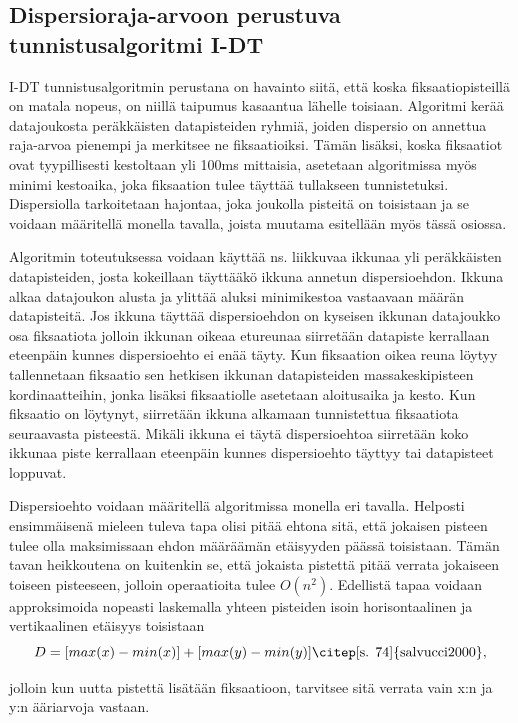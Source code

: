 \subsection{Dispersioraja-arvoon perustuva tunnistusalgoritmi I-DT}
I-DT tunnistusalgoritmin perustana on havainto siitä, että koska fiksaatiopisteillä on matala nopeus, on niillä taipumus kasaantua lähelle toisiaan. Algoritmi kerää datajoukosta peräkkäisten datapisteiden ryhmiä, joiden dispersio on annettua raja-arvoa pienempi ja merkitsee ne fiksaatioiksi. Tämän lisäksi, koska fiksaatiot ovat tyypillisesti kestoltaan yli 100ms mittaisia, asetetaan algoritmissa myös minimi kestoaika, joka fiksaation tulee täyttää tullakseen tunnistetuksi. \citep[s. 74]{salvucci2000} Dispersiolla tarkoitetaan hajontaa, joka joukolla pisteitä on toisistaan ja se voidaan määritellä monella tavalla, joista muutama esitellään myös tässä osiossa.

Algoritmin toteutuksessa voidaan käyttää ns. liikkuvaa ikkunaa yli peräkkäisten datapisteiden, josta kokeillaan täyttääkö ikkuna annetun dispersioehdon. Ikkuna alkaa datajoukon alusta ja ylittää aluksi minimikestoa vastaavaan määrän datapisteitä. Jos ikkuna täyttää dispersioehdon on kyseisen ikkunan datajoukko osa fiksaatiota jolloin ikkunan oikeaa etureunaa siirretään datapiste kerrallaan eteenpäin kunnes dispersioehto ei enää täyty. Kun fiksaation oikea reuna löytyy tallennetaan fiksaatio sen hetkisen ikkunan datapisteiden massakeskipisteen kordinaatteihin, jonka lisäksi fiksaatiolle asetetaan aloitusaika ja kesto. Kun fiksaatio on löytynyt, siirretään ikkuna alkamaan tunnistettua fiksaatiota seuraavasta pisteestä. Mikäli ikkuna ei täytä dispersioehtoa siirretään koko ikkunaa piste kerrallaan eteenpäin kunnes dispersioehto täyttyy tai datapisteet loppuvat. \citep[s.26-27]{gale1984}

Dispersioehto voidaan määritellä algoritmissa monella eri tavalla. Helposti ensimmäisenä mieleen tuleva tapa olisi pitää ehtona sitä, että jokaisen pisteen tulee olla maksimissaan ehdon määräämän etäisyyden päässä toisistaan. Tämän tavan heikkoutena on kuitenkin se, että jokaista pistettä pitää verrata jokaiseen toiseen pisteeseen, jolloin operaatioita tulee \(O(n^2)\). \citep[s.111] {shic2008} Edellistä tapaa voidaan approksimoida nopeasti laskemalla yhteen pisteiden isoin horisontaalinen ja vertikaalinen etäisyys toisistaan 
\[
D = [max(x) - min(x)] + [max(y) - min(y)]  \text{\citep[s. 74]{salvucci2000},}
\]

jolloin kun uutta pistettä lisätään fiksaatioon, tarvitsee sitä verrata vain x:n ja y:n ääriarvoja vastaan.

